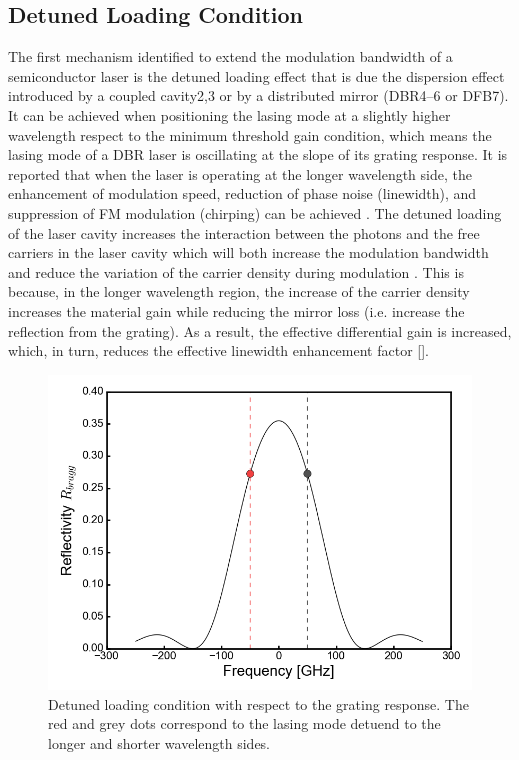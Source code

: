 \subsection{Detuned Loading Condition}\label{subsec:detuned_loading}
The first mechanism identified to extend the modulation bandwidth of a semiconductor laser is the detuned loading effect that is due the dispersion effect introduced by a coupled cavity2,3 or by a distributed mirror (DBR4–6 or DFB7). It can be achieved when positioning the lasing mode at a slightly higher wavelength respect to the minimum threshold gain condition, which means the lasing mode of a DBR laser is oscillating at the slope of its grating response. It is reported that when the laser is operating at the longer wavelength side, the enhancement of modulation speed, reduction of phase noise (linewidth), and suppression of FM modulation (chirping) can be achieved \cite{vahala1984detuned}. The detuned loading of the laser cavity increases the interaction between the photons and the free carriers in the laser cavity \cite{vahala1984detuned} which will both increase the modulation bandwidth and reduce the variation of the carrier density during modulation \cite{kjebon2002experimental}. This is because, in the longer wavelength region, the increase of the carrier density increases the material gain while reducing the mirror loss (i.e. increase the reflection from the grating). As a result, the effective differential gain is increased, which, in turn, reduces the effective linewidth enhancement factor [].

\begin{figure}[ht]
    \centering
    \includegraphics[width=.65\linewidth]{figures/detuned_loading_principle.png}
    \caption{Detuned loading condition with respect to the grating response. The red and grey dots correspond to the lasing mode detuend to the longer and shorter wavelength sides.}
    \label{fig:detuned_loading_principle}
\end{figure}


